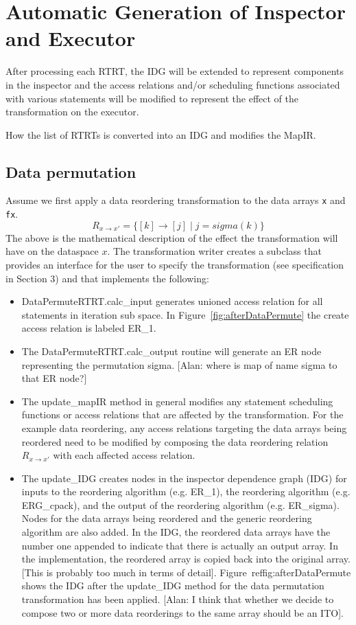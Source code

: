 \documentclass{article}
\begin{document}
\section{Automatic Generation of Inspector and Executor}

After processing each RTRT, the IDG will be extended to represent components in the inspector and the access relations and/or scheduling functions associated with various statements will be modified to represent the effect of the transformation on the executor.

How the list of RTRTs is converted into an IDG and modifies the MapIR.

\subsection{Data permutation}
Assume we first apply a data reordering transformation to the data arrays {\tt x} and {\tt fx}.
\[
	R_{x \rightarrow x'} = \{ [k] \rightarrow [j] \; | \; j = sigma(k) \}
\]
The above is the mathematical description of the effect the transformation will have on the dataspace $x$.  The transformation writer creates a subclass that provides an interface for the user to specify the transformation (see specification in Section 3) and that implements the following:
	\begin{itemize}
	\item DataPermuteRTRT.calc\_input generates unioned access relation for all statements in iteration sub space.  In Figure~\ref{fig:afterDataPermute} the create access relation is labeled ER\_1.
	\item The DataPermuteRTRT.calc\_output routine will generate an ER node representing the permutation sigma.  [Alan: where is map of name sigma to that ER node?]
	\item The update\_mapIR method in general modifies any statement scheduling functions or access relations that are affected by the transformation.  For the example data reordering, any access relations targeting the data arrays being reordered need to be modified by composing the data reordering relation $R_{x \rightarrow x'}$ with each affected access relation.
	\item The update\_IDG creates nodes in the inspector dependence graph (IDG) for inputs to the reordering algorithm (e.g. ER\_1), the reordering algorithm (e.g. ERG\_cpack), and  the output of the reordering algorithm (e.g. ER\_sigma).
	Nodes for the data arrays being reordered and the generic reordering algorithm are also added.  In the IDG, the reordered data arrays have the number one appended to indicate that there is actually an output array.  In the implementation, the reordered array is copied back into the original array. [This is probably too much in terms of detail].
	Figure~ref{fig:afterDataPermute} shows the IDG after the update\_IDG method for the data permutation transformation has been applied.
	[Alan: I think that whether we decide to compose two or more data reorderings to the same array should be an ITO].
	\end{itemize}
	
\end{document}
